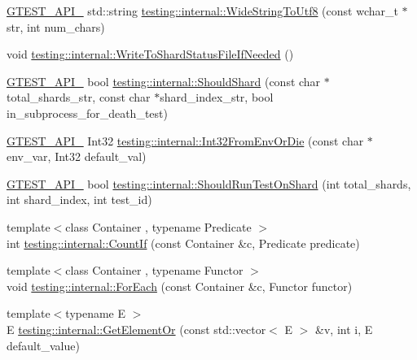 \begin{DoxyCompactItemize}
\item 
\hyperlink{gtest-port_8h_aa73be6f0ba4a7456180a94904ce17790}{G\-T\-E\-S\-T\-\_\-\-A\-P\-I\-\_\-} std\-::string \hyperlink{namespacetesting_1_1internal_a05b8c86ff38243f34d8f839a0eadefb1}{testing\-::internal\-::\-Wide\-String\-To\-Utf8} (const wchar\-\_\-t $\ast$str, int num\-\_\-chars)
\item 
void \hyperlink{namespacetesting_1_1internal_a19b35b39782d41e6ef76e1910a3a502e}{testing\-::internal\-::\-Write\-To\-Shard\-Status\-File\-If\-Needed} ()
\item 
\hyperlink{gtest-port_8h_aa73be6f0ba4a7456180a94904ce17790}{G\-T\-E\-S\-T\-\_\-\-A\-P\-I\-\_\-} bool \hyperlink{namespacetesting_1_1internal_a0fe41657b1d1ab7ec4e37ec07403ee6c}{testing\-::internal\-::\-Should\-Shard} (const char $\ast$total\-\_\-shards\-\_\-str, const char $\ast$shard\-\_\-index\-\_\-str, bool in\-\_\-subprocess\-\_\-for\-\_\-death\-\_\-test)
\item 
\hyperlink{gtest-port_8h_aa73be6f0ba4a7456180a94904ce17790}{G\-T\-E\-S\-T\-\_\-\-A\-P\-I\-\_\-} Int32 \hyperlink{namespacetesting_1_1internal_aaa576613655c2f380278c255c3ec5fef}{testing\-::internal\-::\-Int32\-From\-Env\-Or\-Die} (const char $\ast$env\-\_\-var, Int32 default\-\_\-val)
\item 
\hyperlink{gtest-port_8h_aa73be6f0ba4a7456180a94904ce17790}{G\-T\-E\-S\-T\-\_\-\-A\-P\-I\-\_\-} bool \hyperlink{namespacetesting_1_1internal_a437bd89f5bc532778d7467600e210395}{testing\-::internal\-::\-Should\-Run\-Test\-On\-Shard} (int total\-\_\-shards, int shard\-\_\-index, int test\-\_\-id)
\item 
{\footnotesize template$<$class Container , typename Predicate $>$ }\\int \hyperlink{namespacetesting_1_1internal_a1e77a774d910346eff11a86d8df783a5}{testing\-::internal\-::\-Count\-If} (const Container \&c, Predicate predicate)
\item 
{\footnotesize template$<$class Container , typename Functor $>$ }\\void \hyperlink{namespacetesting_1_1internal_a52f5504ed65d116201ccb8f99a44fd7e}{testing\-::internal\-::\-For\-Each} (const Container \&c, Functor functor)
\item 
{\footnotesize template$<$typename E $>$ }\\E \hyperlink{namespacetesting_1_1internal_a71fdd20a0686bea3dc0cdcd95e0bca1c}{testing\-::internal\-::\-Get\-Element\-Or} (const std\-::vector$<$ E $>$ \&v, int i, E default\-\_\-value)
\item 

\end{DoxyCompactItemize}
